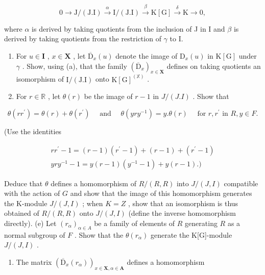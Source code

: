 \[
0 \longrightarrow \mathrm{J} / (\mathrm{J}. \mathrm{I}) \stackrel {\alpha} {\longrightarrow} \mathrm{I} / (\mathrm{J}. \mathrm{I}) \stackrel {\beta} {\longrightarrow} \mathrm{K} [ \mathrm{G} ] \stackrel {\delta} {\longrightarrow} \mathrm{K} \longrightarrow 0,\tag{*}
\]

where \(\alpha\) is derived by taking quotients from the inclusion of J in I and \(\beta\) is derived by taking quotients from the restriction of \(\gamma\) to I.

\begin{enumerate}
\def\labelenumi{(\alph{enumi})}
\setcounter{enumi}{2}
\item
  For \(u \in \mathbf{I}\) , \(x \in \mathbf{X}\) , let \(\overline{\mathrm{D}}_x(u)\) denote the image of \(\mathrm{D}_x(u)\) in \(\mathrm{K}[\mathrm{G}]\) under \(\gamma\) . Show, using (a), that the family \((\overline{\mathrm{D}}_x)_{x \in \mathbf{X}}\) defines on taking quotients an isomorphism of \(\mathrm{I} / (\mathrm{J}. \mathrm{I})\) onto \(\mathrm{K}[\mathrm{G}]^{(\mathbb{X})}\) .
\item
  For \(r \in \mathbb{R}\) , let \(\theta(r)\) be the image of \(r - 1\) in \(J/(J.I)\) . Show that
\end{enumerate}

\[
\theta (r r ^ {\prime}) = \theta (r) + \theta (r ^ {\prime}) \quad \text { and } \quad \theta (y r y ^ {- 1}) = y. \theta (r) \quad \text { for   } r, r ^ {\prime} \text {   in   } R, y \in F.
\]

(Use the identities

\[
\begin{array}{c} {r r ^ {\prime} - 1 = (r - 1) (r ^ {\prime} - 1) + (r - 1) + (r ^ {\prime} - 1)} \\ {y r y ^ {- 1} - 1 = y (r - 1) (y ^ {- 1} - 1) + y (r - 1).)} \end{array}
\]

Deduce that \(\theta\) defines a homomorphism of \(R/(R, R)\) into \(J/(J, I)\) compatible with the action of \(G\) and show that the image of this homomorphism generates the K-module \(J/(J, I)\) ; when \(K = Z\) , show that an isomorphism is thus obtained of \(R/(R, R)\) onto \(J/(J, I)\) (define the inverse homomorphism directly). (e) Let \((r_{\alpha})_{\alpha \in A}\) be a family of elements of \(R\) generating \(R\) as a normal subgroup of \(F\) . Show that the \(\theta(r_{\alpha})\) generate the K{[}G{]}-module \(J/(J, I)\) .

\begin{enumerate}
\def\labelenumi{(\alph{enumi})}
\setcounter{enumi}{5}
\tightlist
\item
  The matrix \((\overline{\mathrm{D}}_x(r_\alpha))_{x\in \mathbf{X},\alpha \in \mathbf{A}}\) defines a homomorphism
\end{enumerate}

